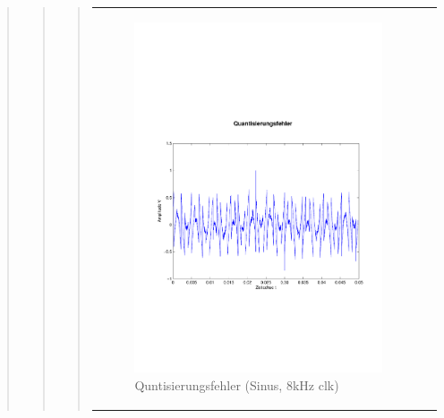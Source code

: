 \begin{quote}
\begin{quote}
\begin{quote}
            \begin{center}
                \begin{tabular}{ll}
                
                \hspace{-4cm}
                    
                    \begin{minipage}{0.55\textwidth}
                        \begin{figure}[H]
                            \includegraphics[scale=0.4, trim = 0cm 7cm 0cm
                            7.5cm, clip]
                            {./Bilder/sin8_Quantisierungsfehler}
                              \caption{Quntisierungsfehler (Sinus, 8kHz clk)}
                              \label{sin8_qf}
                        \end{figure}
                    \end{minipage}
                                  

\end{tabular}
\end{center}
\end{quote}
\end{quote}
\end{quote}
